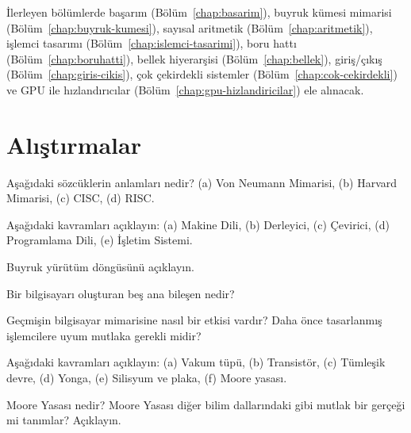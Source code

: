 İlerleyen bölümlerde başarım (Bölüm~\ref{chap:basarim}), buyruk kümesi mimarisi (Bölüm~\ref{chap:buyruk-kumesi}), sayısal aritmetik (Bölüm~\ref{chap:aritmetik}), işlemci tasarımı (Bölüm~\ref{chap:islemci-tasarimi}), boru hattı (Bölüm~\ref{chap:boruhatti}), bellek hiyerarşisi (Bölüm~\ref{chap:bellek}), giriş/çıkış (Bölüm~\ref{chap:giris-cikis}), çok çekirdekli sistemler (Bölüm~\ref{chap:cok-cekirdekli}) ve GPU ile hızlandırıcılar (Bölüm~\ref{chap:gpu-hizlandiricilar}) ele alınacak.


\section*{Alıştırmalar}
\label{sec:giris-alistirmalar}

\begin{alistirma}[\kolay]
Aşağıdaki sözcüklerin anlamları nedir? (a) Von Neumann Mimarisi, (b) Harvard Mimarisi, (c) CISC, (d) RISC.
\end{alistirma}

\begin{alistirma}[\kolay]
Aşağıdaki kavramları açıklayın: (a) Makine Dili, (b) Derleyici, (c) Çevirici, (d) Programlama Dili, (e) İşletim Sistemi.
\end{alistirma}

\begin{alistirma}[\kolay]
Buyruk yürütüm döngüsünü açıklayın.
\end{alistirma}

\begin{alistirma}[\kolay]
Bir bilgisayarı oluşturan beş ana bileşen nedir?
\end{alistirma}

\begin{alistirma}[\orta]
Geçmişin bilgisayar mimarisine nasıl bir etkisi vardır? Daha önce tasarlanmış işlemcilere uyum mutlaka gerekli midir?
\end{alistirma}

\begin{alistirma}[\kolay]
Aşağıdaki kavramları açıklayın: (a) Vakum tüpü, (b) Transistör, (c) Tümleşik devre, (d) Yonga, (e) Silisyum ve plaka, (f) Moore yasası.
\end{alistirma}

\begin{alistirma}[\orta]
Moore Yasası nedir? Moore Yasası diğer bilim dallarındaki gibi mutlak bir gerçeği mi tanımlar? Açıklayın.
\end{alistirma}

